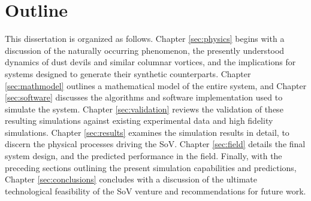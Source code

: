 %





\section{Outline}

This dissertation is organized as follows. Chapter \ref{sec:physics}
begins 
with a discussion of the naturally occurring phenomenon, the presently
understood dynamics of dust devils and similar columnar vortices, and
the implications for systems designed to generate their synthetic
counterparts. Chapter \ref{sec:mathmodel} outlines a mathematical model
of the entire system, and Chapter \ref{sec:software} discusses the 
algorithms and software implementation used to simulate the
system. Chapter \ref{sec:validation} reviews the validation of
these resulting simulations against existing experimental data and high 
fidelity simulations.  
Chapter \ref{sec:results} examines the simulation results in detail, to
discern the physical processes driving the SoV. Chapter \ref{sec:field}
details the final system design, and the predicted performance in the
field.  
%
%
%
%
Finally, with the preceding sections outlining the present simulation
capabilities and predictions, Chapter \ref{sec:conclusions} concludes
with a discussion of the ultimate technological feasibility of the
SoV venture and recommendations for future work. 

%
